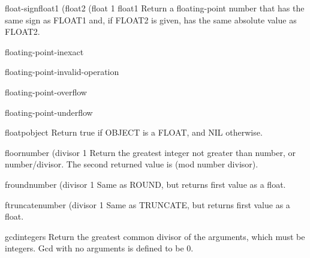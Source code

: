 \begin{function}{float-sign}{float1 \op (float2 (float 1 float1}{}
  Return a floating-point number that has the same sign as
   FLOAT1 and, if FLOAT2 is given, has the same absolute value
   as FLOAT2.
\end{function}

\begin{condition-type}{floating-point-inexact}{}{}
  
\end{condition-type}

\begin{condition-type}{floating-point-invalid-operation}{}{}
  
\end{condition-type}

\begin{condition-type}{floating-point-overflow}{}{}
  
\end{condition-type}

\begin{condition-type}{floating-point-underflow}{}{}
  
\end{condition-type}

\begin{function}{floatp}{object}{}
  Return true if OBJECT is a FLOAT, and NIL otherwise.
\end{function}

\begin{function}{floor}{number \op (divisor 1}{}
  Return the greatest integer not greater than number, or number/divisor.
  The second returned value is (mod number divisor).
\end{function}

\begin{function}{fround}{number \op (divisor 1}{}
  Same as ROUND, but returns first value as a float.
\end{function}

\begin{function}{ftruncate}{number \op (divisor 1}{}
  Same as TRUNCATE, but returns first value as a float.
\end{function}

\begin{function}{gcd}{\rest integers}{}
  Return the greatest common divisor of the arguments, which must be
  integers. Gcd with no arguments is defined to be 0.
\end{function}

